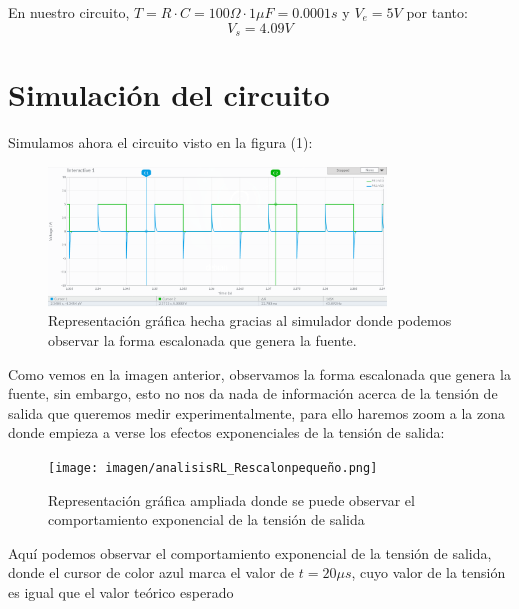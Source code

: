 \documentclass[11pt,letterpaper]{article}
\begin{document}
En nuestro circuito, $T=R\cdot C=100\Omega \cdot 1 \mu F=0.0001 s $ y $V_e= 5 V$ por tanto:
\begin{equation}
	\boxed{V_s=4.09V}
\end{equation}
\section{Simulación del circuito}%
\label{sec:Simulación del circuito}
Simulamos ahora el circuito visto en la figura (1):
\begin{figure}[H]
	\centering
	\includegraphics[width=0.8\textwidth]{imagen/analisisRL_R_escalongrande.png}
	\caption{Representación gráfica hecha gracias al simulador donde podemos observar la forma escalonada que genera la fuente.}
	\label{fig:imagen-analisisRL_R_escalongrande-png}
\end{figure}
Como vemos en la imagen anterior, observamos la forma escalonada que genera la fuente, sin embargo, esto no nos da nada de información acerca de la tensión de salida que queremos medir experimentalmente, para ello haremos zoom a la zona donde empieza a verse los efectos exponenciales de la tensión de salida:
\begin{figure}[H]
	\centering
	\texttt{[image: imagen/analisisRL\_Rescalonpequeño.png]}
	\caption{Representación gráfica ampliada donde se puede observar el comportamiento exponencial de la tensión de salida}
	\label{fig:imagen-analisisRL_Rescalonpeque-png}
\end{figure}
Aquí podemos observar el comportamiento exponencial de la tensión de salida, donde el cursor de color azul marca el valor de $t=20\mu s$, cuyo valor de la tensión es igual que el valor teórico esperado
\end{document}
